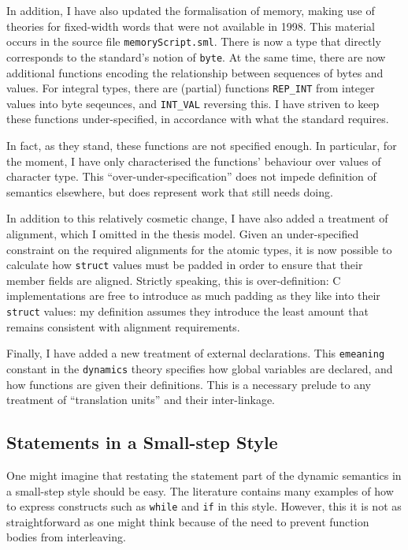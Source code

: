 \documentclass[11pt]{article}
\begin{document}
In addition, I have also updated the formalisation of memory, making
use of theories for fixed-width words that were not available in 1998.
This material occurs in the source file \texttt{memoryScript.sml}.
There is now a type that directly corresponds to the standard's notion
of \texttt{byte}.  At the same time, there are now additional
functions encoding the relationship between sequences of bytes and
values.  For integral types, there are (partial) functions
\texttt{REP\_INT} from integer values into byte seqeunces, and
\texttt{INT\_VAL} reversing this.  I have striven to keep these
functions under-specified, in accordance with what the standard
requires.

In fact, as they stand, these functions are not specified enough.  In
particular, for the moment, I have only characterised the functions'
behaviour over values of character type.  This
``over-under-specification'' does not impede definition of semantics
elsewhere, but does represent work that still needs doing.

In addition to this relatively cosmetic change, I have also added a
treatment of alignment, which I omitted in the thesis model.  Given an
under-specified constraint on the required alignments for the atomic
types, it is now possible to calculate how \texttt{struct} values must
be padded in order to ensure that their member fields are aligned.
Strictly speaking, this is over-definition: C implementations are free
to introduce as much padding as they like into their \texttt{struct}
values: my definition assumes they introduce the least amount that
remains consistent with alignment requirements.

Finally, I have added a new treatment of external declarations.  This
\texttt{emeaning} constant in the \texttt{dynamics} theory specifies
how global variables are declared, and how functions are given their
definitions.  This is a necessary prelude to any treatment of
``translation units'' and their inter-linkage.

\subsection{Statements in a Small-step Style}
\label{sec:small-step-stmts}

One might imagine that restating the statement part of the dynamic
semantics in a small-step style should be easy.  The literature
contains many examples of how to express constructs such as
\texttt{while} and \texttt{if} in this style.  However, this it is not
as straightforward as one might think because of the need to prevent
function bodies from interleaving.
\end{document}
